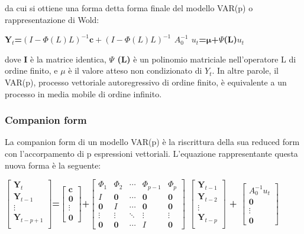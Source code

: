 \documentclass[12pt,a4paper,twoside,openright]{book}
\begin{document}
da cui si ottiene una forma detta forma finale del modello VAR(p) o rappresentazione di Wold:
\begin{center}
{\bfseries
$\mathbf{Y}_t$=$\left(I-\Phi(L)L\right)^{-1}\mathbf{c}+\left(I-\Phi(L)L\right)^{-1}$ $A_0^{-1}$ $u_t$=$\mathbf{\mu}$+$\Psi$(L)$u_t$
}
\end{center}

dove {\bfseries I} è la matrice identica, {\bfseries $\Psi$ (L)} è un polinomio matriciale nell'operatore L di ordine finito, e {\bfseries $\mu$} è il valore atteso non condizionato di {\bfseries $Y_t$}. In altre parole, il VAR(p), processo vettoriale autoregressivo di ordine finito, è equivalente a un processo in media mobile di ordine infinito.
\subsubsection{Companion form}
La companion form di un modello VAR(p) è la riscrittura della sua reduced form con l'accorpamento di p espressioni vettoriali. L'equazione rappresentante questa nuova forma è la seguente:
\begin{center}
{\bfseries
$\begin{bmatrix}\mathbf{Y}_t\\\mathbf{Y}_{t-1}\\\vdots\\\mathbf{Y}_{t-p+1}\\\end{bmatrix}$=$\begin{bmatrix}\mathbf{c}\\\mathbf{0}\\\vdots\\\mathbf{0}\end{bmatrix}$+$\begin{bmatrix}\Phi_1 & \Phi_2 & \cdots & \Phi_{p-1} & \Phi_p\\ I & \mathbf{0} & \cdots & \mathbf{0} & \mathbf{0}\\ \mathbf{0} & I & \cdots & \mathbf{0} & \mathbf{0}\\ \vdots & \vdots & \ddots & \vdots & \vdots\\ \mathbf{0} & \mathbf{0} & \cdots & I & \mathbf{0}\end{bmatrix}$ $\begin{bmatrix}\mathbf{Y}_{t-1}\\\mathbf{Y}_{t-2}\\\vdots\\\mathbf{Y}_{t-p}\\\end{bmatrix}$ + $\begin{bmatrix}A_0^{-1}u_t\\ \mathbf{0}\\ \vdots\\ \mathbf{0}\end{bmatrix}$
}
\end{center}
\end{document}
